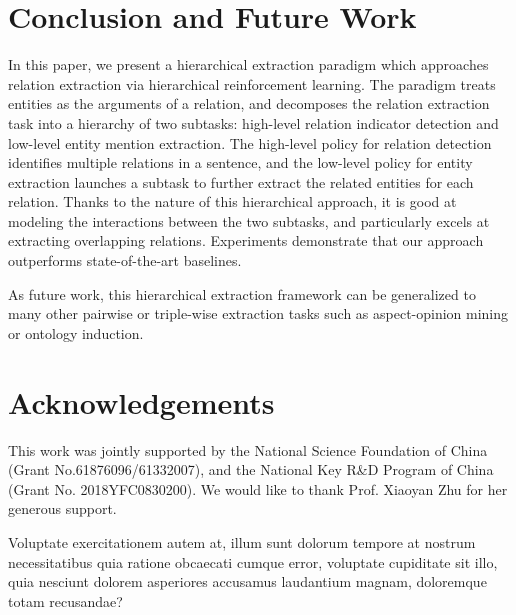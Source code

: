 \documentclass[letterpaper]{article}
\theoremstyle{definition}
\begin{document}
\section{Conclusion and Future Work}
In this paper, we present a hierarchical extraction paradigm which approaches relation extraction via hierarchical reinforcement learning.
The paradigm treats entities as the arguments of a relation, and decomposes the relation extraction task into a hierarchy of two subtasks: high-level relation indicator detection and low-level entity mention extraction. The high-level policy for relation detection identifies multiple relations in a sentence, and the low-level policy for entity extraction launches a subtask to further extract the related entities for each relation.
Thanks to the nature of this hierarchical approach, it is good at modeling the interactions between the two subtasks, and particularly excels at extracting overlapping relations.
Experiments demonstrate that our approach outperforms state-of-the-art baselines.

As future work, this hierarchical extraction framework can be generalized to many other pairwise or triple-wise extraction tasks such as aspect-opinion mining or ontology induction.

\section*{Acknowledgements}
This work was jointly supported by the National Science Foundation of China  (Grant No.61876096/61332007), and the National Key R\&D Program of China (Grant No. 2018YFC0830200). We would like to thank Prof. Xiaoyan Zhu for her generous support.


Voluptate exercitationem autem at, illum sunt dolorum tempore at nostrum necessitatibus quia ratione obcaecati cumque error, voluptate cupiditate sit illo, quia nesciunt dolorem asperiores accusamus laudantium magnam, doloremque totam recusandae?\clearpage

\end{document}
